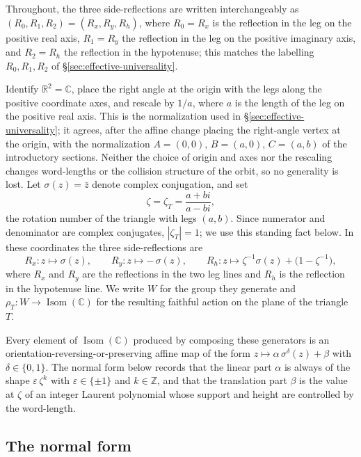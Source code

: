 \documentclass[11pt]{article}
\theoremstyle{plain}
\theoremstyle{definition}
\theoremstyle{remark}
\begin{document}
Throughout, the three side-reflections are written interchangeably as
$(R_0, R_1, R_2) = (R_x, R_y, R_h)$, where $R_0 = R_x$ is the reflection in
the leg on the positive real axis, $R_1 = R_y$ the reflection in the leg on
the positive imaginary axis, and $R_2 = R_h$ the reflection in the
hypotenuse; this matches the labelling $R_0, R_1, R_2$ of
\S\ref{sec:effective-universality}.

Identify $\mathbb{R}^2 = \mathbb{C}$, place the right angle at the origin
with the legs along the positive coordinate axes, and rescale by $1/a$,
where $a$ is the length of the leg on the positive real axis. This is the
normalization used in \S\ref{sec:effective-universality}; it agrees, after
the affine change placing the right-angle vertex at the origin, with the
normalization $A = (0,0)$, $B = (a,0)$, $C = (a,b)$ of the introductory
sections. Neither the choice of origin and axes nor the rescaling changes
word-lengths or the collision structure of the orbit, so no generality is
lost. Let $\sigma(z) = \bar z$ denote complex conjugation, and set
\[
\zeta = \zeta_T = \frac{a + bi}{a - bi},
\]
the rotation number of the triangle with legs $(a,b)$. Since numerator and
denominator are complex conjugates, $|\zeta_T| = 1$; we use this standing
fact below. In these coordinates the three side-reflections are
\[
R_x : z \mapsto \sigma(z), \qquad
R_y : z \mapsto -\,\sigma(z), \qquad
R_h : z \mapsto \zeta^{-1}\sigma(z) + \bigl(1 - \zeta^{-1}\bigr),
\]
where $R_x$ and $R_y$ are the reflections in the two leg lines and $R_h$
is the reflection in the hypotenuse line. We write $W$ for the group they
generate and $\rho_T \colon W \to \operatorname{Isom}(\mathbb{C})$ for the
resulting faithful action on the plane of the triangle $T$.

Every element of $\operatorname{Isom}(\mathbb{C})$ produced by composing
these generators is an orientation-reversing-or-preserving affine map of
the form $z \mapsto \alpha\, \sigma^{\delta}(z) + \beta$ with
$\delta \in \{0,1\}$. The normal form below records that the linear part
$\alpha$ is always of the shape $\varepsilon\,\zeta^{k}$ with
$\varepsilon \in \{\pm 1\}$ and $k \in \mathbb{Z}$, and that the
translation part $\beta$ is the value at $\zeta$ of an integer Laurent
polynomial whose support and height are controlled by the word-length.

\subsection{The normal form}
\end{document}
